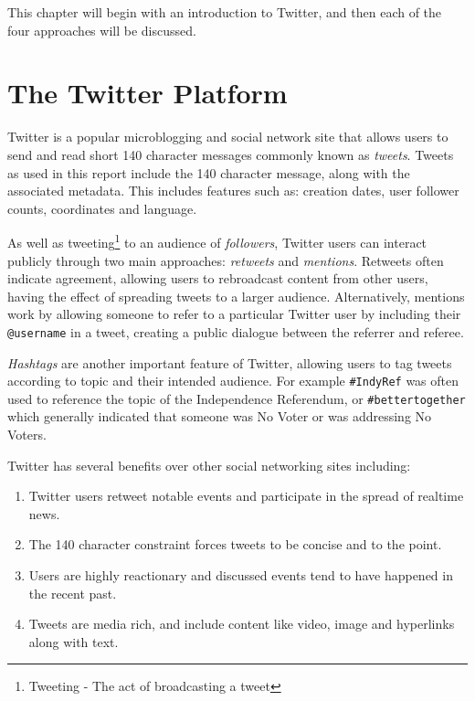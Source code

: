 \documentclass[bsc,frontabs,singlespacing,parskip]{infthesis}     %
\begin{document}
This chapter will begin with an introduction to Twitter, and then each of the four approaches will be discussed.

\section{The Twitter Platform}
\label{sec:twitterplatform}
Twitter is a popular microblogging and social network site that allows users to send and read short 140 character messages commonly known as \textit{tweets}. Tweets as used in this report include the 140 character message, along with the associated metadata. This includes features such as: creation dates, user follower counts, coordinates and language. 

As well as tweeting\footnote{Tweeting - The act of broadcasting a tweet} to an audience of \textit{followers}, Twitter users can interact publicly through two main approaches: \textit{retweets} and \textit{mentions}. Retweets often indicate agreement\cite{retweetagreement}, allowing users to rebroadcast content from other users, having the effect of spreading tweets to a larger audience\cite{largeraudiance}. Alternatively, mentions work by allowing someone to refer to a particular Twitter user by including their \texttt{@username} in a tweet, creating a public dialogue between the referrer and referee.

\textit{Hashtags} are another important feature of Twitter, allowing users to tag tweets according to topic and their intended audience. For example \texttt{\#IndyRef} was often used to reference the topic of the Independence Referendum, or \texttt{\#bettertogether} which generally indicated that someone was No Voter or was addressing No Voters.

Twitter has several benefits over other social networking sites \cite{benefitsoftwitter}\cite{quantpol} including:
\begin{enumerate}
\item{Twitter users retweet notable events and participate in the spread of realtime news.}
\item{The 140 character constraint forces tweets to be concise and to the point.}
\item{Users are highly reactionary and discussed events tend to have happened in the recent past.}
\item{Tweets are media rich, and include content like video, image and hyperlinks along with text.} 
\end{enumerate}
\end{document}
